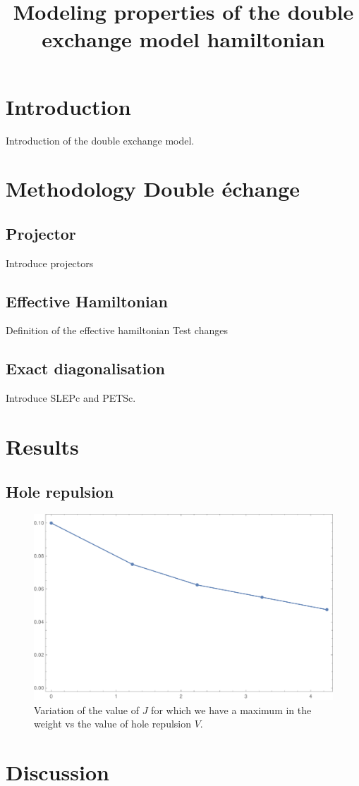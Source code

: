 \documentclass[ openright,titlepage,numbers=noenddot,headinclude,twoside,%
                footinclude=true,cleardoublepage=empty,abstractoff,%
                BCOR=5mm,paper=a4,fontsize=11pt,%
                ngerman,american,%
]{scrreprt}
\title{Modeling properties of the double exchange model hamiltonian}
\begin{document}
\maketitle
\thispagestyle{fancy}
\section{Introduction}

Introduction of the double exchange model.

\section{Methodology Double échange}

\subsection{Projector}

Introduce projectors

\subsection{Effective Hamiltonian}

Definition of the effective hamiltonian
Test changes

\subsection{Exact diagonalisation}

Introduce SLEPc and PETSc.

\section{Results}

\subsection{Hole repulsion}

\begin{figure}[ht]
    \centering
    \includegraphics[scale=0.5]{"12_4h_J_wmax_vs_xrep.pdf"}
    \caption{\label{fig:}Variation of the value of $J$ for which we have a maximum in the weight vs the value of hole repulsion $V$. }
\end{figure}

\section{Discussion}
\end{document}
